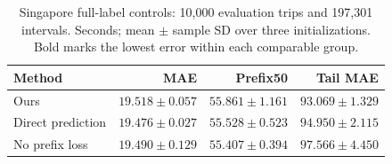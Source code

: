 \begin{table}[t]
\centering\footnotesize\setlength{\tabcolsep}{4pt}
\caption{Singapore full-label controls: 10,000 evaluation trips and 197,301 intervals. Seconds; mean $\pm$ sample SD over three initializations. Bold marks the lowest error within each comparable group.}\label{tab:singapore}
\begin{tabular}{lrrr}\toprule
Method & MAE & Prefix50 & Tail MAE\\\midrule
Ours & $19.518\pm0.057$ & $55.861\pm1.161$ & $\mathbf{93.069\pm1.329}$\\
Direct prediction & $\mathbf{19.476\pm0.027}$ & $55.528\pm0.523$ & $94.950\pm2.115$\\
No prefix loss & $19.490\pm0.129$ & $\mathbf{55.407\pm0.394}$ & $97.566\pm4.450$\\
\bottomrule\end{tabular}
\end{table}
